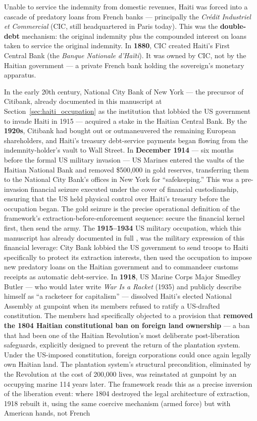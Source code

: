 Unable to service the indemnity from domestic revenues, Haiti was forced into a cascade of predatory loans from French banks --- principally the \textit{Crédit Industriel et Commercial} (CIC, still headquartered in Paris today). This was the \textbf{double-debt} mechanism: the original indemnity plus the compounded interest on loans taken to service the original indemnity. In \textbf{1880}, CIC created Haiti's First Central Bank (the \textit{Banque Nationale d'Ha\"iti}). It was owned by CIC, not by the Haitian government --- a private French bank holding the sovereign's monetary apparatus.

In the early 20th century, National City Bank of New York --- the precursor of Citibank, already documented in this manuscript at Section~\ref{sec:haiti_occupation} as the institution that lobbied the US government to invade Haiti in 1915 --- acquired a stake in the Haitian Central Bank. By the \textbf{1920s}, Citibank had bought out or outmaneuvered the remaining European shareholders, and Haiti's treasury debt-service payments began flowing from the indemnity-holder's vault to Wall Street. In \textbf{December 1914} --- six months before the formal US military invasion --- US Marines entered the vaults of the Haitian National Bank and removed \$500,000 in gold reserves, transferring them to the National City Bank's offices in New York for ``safekeeping.'' This was a pre-invasion financial seizure executed under the cover of financial custodianship, ensuring that the US held physical control over Haiti's treasury before the occupation began. The gold seizure is the precise operational definition of the framework's extraction-before-enforcement sequence: secure the financial kernel first, then send the army. The \textbf{1915--1934} US military occupation, which this manuscript has already documented in full \cite{nyt_ransom2022}, was the military expression of this financial leverage: City Bank lobbied the US government to send troops to Haiti specifically to protect its extraction interests, then used the occupation to impose new predatory loans on the Haitian government and to commandeer customs receipts as automatic debt-service. In \textbf{1918}, US Marine Corps Major Smedley Butler --- who would later write \textit{War Is a Racket} (1935) and publicly describe himself as ``a racketeer for capitalism'' --- dissolved Haiti's elected National Assembly at gunpoint when its members refused to ratify a US-drafted constitution. The members had specifically objected to a provision that \textbf{removed the 1804 Haitian constitutional ban on foreign land ownership} --- a ban that had been one of the Haitian Revolution's most deliberate post-liberation safeguards, explicitly designed to prevent the return of the plantation system. Under the US-imposed constitution, foreign corporations could once again legally own Haitian land. The plantation system's structural precondition, eliminated by the Revolution at the cost of 200,000 lives, was reinstated at gunpoint by an occupying marine 114 years later. The framework reads this as a precise inversion of the liberation event: where 1804 destroyed the legal architecture of extraction, 1918 rebuilt it, using the same coercive mechanism (armed force) but with American hands, not French 
